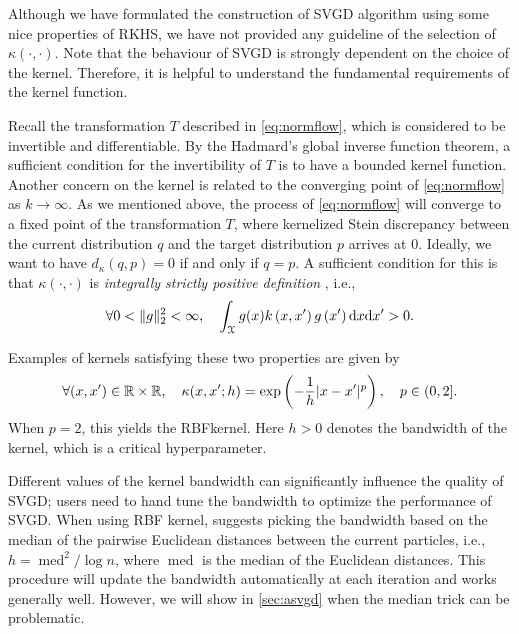 Although we have formulated the construction of SVGD algorithm using some nice properties of RKHS, we have not provided any guideline of the selection of $\kappa(\cdot, \cdot)$. Note that the behaviour of SVGD is strongly dependent on the choice of the kernel.  Therefore, it is helpful to understand the fundamental requirements of the kernel function.

Recall the transformation $T$ described in \cref{eq:normflow}, which is considered to be invertible and differentiable. By the Hadmard's global inverse function theorem, a sufficient condition for the invertibility of $T$ is to have a bounded kernel function. 
Another concern on the kernel is related to the converging point of \cref{eq:normflow} as $k \to \infty$. As we mentioned above, the process of \cref{eq:normflow} will converge to a fixed point of the transformation $T$, where kernelized Stein discrepancy between the current distribution $q$ and the target distribution $p$ arrives at 0. Ideally, we want to have $d_\kappa(q ,p) = 0$ if and only if $q = p$. A sufficient condition for this is that $\kappa(\cdot, \cdot)$ is \emph{integrally strictly positive definition} \citep{liu2016kernelized}, i.e., 
\[
\forall  0<\|g\|_{2}^{2}<\infty, \quad    \int_{\mathcal{X}} g(x) k\left(x, x^{\prime}\right) g\left(x^{\prime}\right) \mathrm{d} x \mathrm{d} x^{\prime}>0.    
\]

Examples of kernels satisfying these two properties are given by  
\[
\forall (x, x')\in \mathbb{R}\times \mathbb{R},\quad  \kappa(x, x'; h) = \exp\left( -\frac{1}{h} |x - x'|^p \right),  \quad p \in(0, 2].
\]
When $p = 2$, this yields the RBFkernel. Here $h> 0$ denotes the bandwidth of the kernel, which is a critical hyperparameter. 

Different values of the kernel bandwidth can significantly influence the quality of SVGD; users need to hand tune the bandwidth to optimize the performance of SVGD. When using RBF  kernel, \citet{liu2016stein} suggests picking the bandwidth based on the median of the pairwise Euclidean distances between the current particles, i.e., $h=\operatorname{med}^{2} / \log n$, where $\operatorname{med}$ is the median of the Euclidean distances. This procedure will update the bandwidth automatically at each iteration and works generally well. However, we will show in \cref{sec:asvgd} when the median trick can be problematic.




